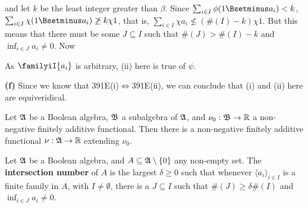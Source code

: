 {\noindent and let $k$ be the least integer greater than $\beta$.   Since
$\sum_{i\in I}\phi(1\Bsetminus a_i)<k$,
$\sum_{i\in I}\chi(1\Bsetminus a_i)\not\ge k\chi 1$, that is,
$\sum_{i\in I}\chi a_i\not\le(\#(I)-k)\chi 1$.   But this means that
there must be some $J\subseteq I$ such
that $\#(J)>\#(I)-k$ and $\inf_{i\in J}a_i\ne 0$.   Now


\noindent As $\familyiI{a_i}$ is arbitrary, (ii) here is true of $\psi$.

\medskip

{\bf (f)} Since we know that 391E(i)$\Leftrightarrow$391E(ii), 
we can conclude that (i) and (ii) here are equiveridical.
}%

 Let $\frak A$ be a Boolean algebra, $\frak B$ a
subalgebra of $\frak A$, and $\nu_0:\frak B\to\Bbb R$ a non-negative
finitely additive functional.   Then there is a non-negative finitely
additive functional $\nu:\frak A\to\Bbb R$ extending $\nu_0$.


 Let $\frak A$ be a Boolean algebra, and
$A\subseteq\frak A\setminus\{0\}$ any non-empty set.   The {\bf
intersection number} of $A$ is the largest $\delta\ge 0$ such that
whenever $\langle a_i\rangle_{i\in I}$ is a finite family in $A$, with
$I\ne\emptyset$, there is a $J\subseteq I$ such that
$\#(J)\ge\delta\#(I)$ and $\inf_{i\in J}a_i\ne 0$.

